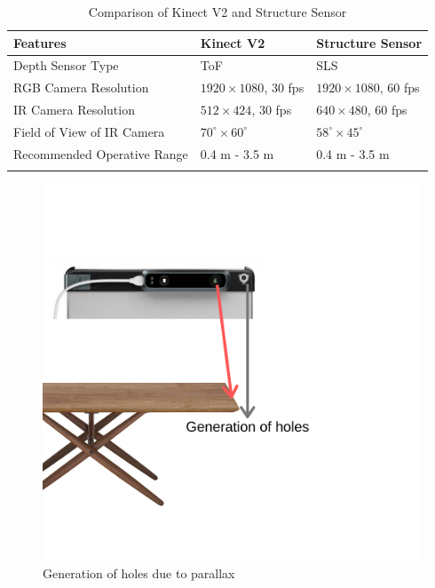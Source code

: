 \begin{table}[h]
\begin{tabular}{@{}lll@{}}
\toprule
\textbf{Features}                    & \textbf{Kinect V2}           & \textbf{Structure Sensor}         \\ \midrule
Depth Sensor Type           & ToF & SLS                 \\
RGB Camera Resolution       & $1920\times1080$, 30 fps & $1920\times1080$, 60 fps     \\
IR Camera Resolution        & $512\times424$, 30 fps   & $640\times480$, 60 fps                 \\ 
Field of View of IR Camera  & $70^\circ\times60^\circ$           & $58^\circ\times45^\circ$                         \\
Recommended Operative Range & 0.4 m - 3.5 m       & 0.4 m - 3.5 m                                  \\
           &                     & 
\end{tabular}
\caption{Comparison of Kinect V2 and Structure Sensor}
\label{table:KinectVsStructureSensor}
\end{table}
\begin{figure}[h]
    \centering
    \includegraphics[scale=0.4]{Figures/holes.png}
    \caption{Generation of holes due to parallax}
    \label{fig:holes}
\end{figure}
